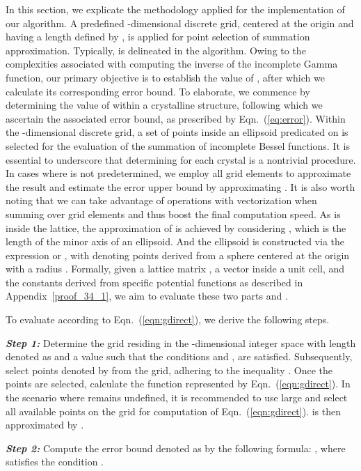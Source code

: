\documentclass[nohyperref]{article}
\theoremstyle{plain}
\theoremstyle{definition}
\theoremstyle{remark}
\begin{document}
In this section, we explicate the methodology applied for the implementation of our algorithm. A predefined -dimensional discrete grid, centered at the origin and having a length defined by , is applied for point selection of summation approximation. Typically,  is delineated in the algorithm. Owing to the complexities associated with computing the inverse of the incomplete Gamma function, our primary objective is to establish the value of , after which we calculate its corresponding error bound. To elaborate, we commence by determining the value of  within a crystalline structure, following which we ascertain the associated error bound, as prescribed by Eqn.~(\ref{eq:error}). Within the -dimensional discrete grid, a set of points inside an ellipsoid predicated on  is selected for the evaluation of the summation of incomplete Bessel functions. It is essential to underscore that determining  for each crystal is a nontrivial procedure. In cases where  is not predetermined, we employ all grid elements to approximate the result and estimate the error upper bound by approximating . It is also worth noting that we can take advantage of operations with vectorization when summing over grid elements and thus boost the final computation speed. As  is inside the lattice, the approximation of  is achieved by considering , which is the length of the minor axis of an ellipsoid. And the ellipsoid is constructed via the expression  or , with  denoting points derived from a sphere centered at the origin with a radius . Formally, given a lattice matrix , a vector  inside a unit cell, and the constants  derived from specific potential functions as described in Appendix~\ref{proof_34_1}, we aim to evaluate these two parts  and .

To evaluate  according to Eqn.~(\ref{eqn:gdirect}), we derive the following steps. 

\emph{\textbf{Step 1:}} Determine the grid residing in the -dimensional integer space  with length denoted as  and a value  such that the conditions  and ,  are satisfied. Subsequently, select points denoted by  from the grid, adhering to the inequality . Once the points are selected, calculate the function represented by Eqn.~(\ref{eqn:gdirect}). In the scenario where  remains undefined, it is recommended to use large  and select all available points on the grid for computation of Eqn.~(\ref{eqn:gdirect}).  is then approximated by .

\emph{\textbf{Step 2:}} 
Compute the error bound denoted as  by the following formula: , where  satisfies the condition .
\end{document}
